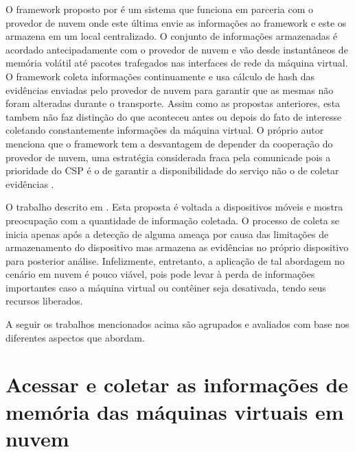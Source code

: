 O framework proposto por \cite{SangLogApproach:2013} é um sistema que funciona em parceria com o provedor de nuvem onde este última envie as informações ao framework e este os armazena em um local centralizado.
%
O conjunto de informações armazenadas é acordado antecipadamente com o provedor de nuvem e vão desde instantâneos de memória volátil até pacotes trafegados nas interfaces de rede da máquina virtual.
%
O framework coleta informações continuamente e usa cálculo de hash das evidências enviadas pelo provedor de nuvem para garantir que as mesmas não foram alteradas durante o transporte.
%
Assim como as propostas anteriores, esta tambem não faz distinção do que aconteceu antes ou depois do fato de interesse coletando constantemente informações da máquina virtual.
%
O próprio autor menciona que o framework tem a desvantagem de depender da cooperação do provedor de nuvem, uma estratégia considerada fraca pela comunicade pois a prioridade do CSP é o de garantir a disponibilidade do serviço não o de coletar evidências \cite{ClarkeReviewOfChallenges2015}.
%

O trabalho descrito em \cite{DezfouliBackupApproach:2012}. Esta proposta é voltada a dispositivos móveis e mostra preocupação com a quantidade de informação coletada. 
%
O processo de coleta se inicia apenas após a detecção de alguma ameaça por causa das limitações de armazenamento do dispositivo mas armazena as evidências no próprio dispositivo para posterior análise.
%
Infelizmente, entretanto, a aplicação de tal abordagem no cenário em nuvem é pouco viável, pois pode levar à perda de informações importantes caso a máquina virtual ou contêiner seja desativada, tendo seus recursos liberados.
%

A seguir os trabalhos mencionados acima são agrupados e avaliados com base nos diferentes aspectos que abordam.

\cite{DykstraFROST:2013}
\cite{GeorgeDF2CE:2012}

\section{Acessar e coletar as informações de memória das máquinas virtuais em nuvem}
\label{sec:coletadeevidencia}

